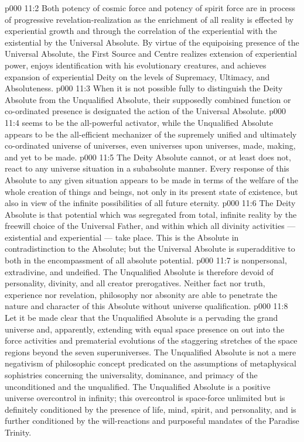 \vs p000 11:2 Both potency of cosmic force and potency of spirit force are in process of progressive revelation\hyp{}realization as the enrichment of all reality is effected by experiential growth and through the correlation of the experiential with the existential by the Universal Absolute. By virtue of the equipoising presence of the Universal Absolute, the First Source and Centre realizes extension of experiential power, enjoys identification with his evolutionary creatures, and achieves expansion of experiential Deity on the levels of Supremacy, Ultimacy, and Absoluteness.
\vs p000 11:3 \pc When it is not possible fully to distinguish the Deity Absolute from the Unqualified Absolute, their supposedly combined function or co\hyp{}ordinated presence is designated the action of the Universal Absolute.
\vs p000 11:4 \bibnobreakspace {} seems to be the all\hyp{}powerful activator, while the Unqualified Absolute appears to be the all\hyp{}efficient mechanizer of the supremely unified and ultimately co\hyp{}ordinated universe of universes, even universes upon universes, made, making, and yet to be made.
\vs p000 11:5 The Deity Absolute cannot, or at least does not, react to any universe situation in a subabsolute manner. Every response of this Absolute to any given situation appears to be made in terms of the welfare of the whole creation of things and beings, not only in its present state of existence, but also in view of the infinite possibilities of all future eternity.
\vs p000 11:6 The Deity Absolute is that potential which was segregated from total, infinite reality by the freewill choice of the Universal Father, and within which all divinity activities --- existential and experiential --- take place. This is the  Absolute in contradistinction to the  Absolute; but the Universal Absolute is superadditive to both in the encompassment of all absolute potential.
\vs p000 11:7 \bibnobreakspace {} is nonpersonal, extradivine, and undeified. The Unqualified Absolute is therefore devoid of personality, divinity, and all creator prerogatives. Neither fact nor truth, experience nor revelation, philosophy nor absonity are able to penetrate the nature and character of this Absolute without universe qualification.
\vs p000 11:8 Let it be made clear that the Unqualified Absolute is a  pervading the grand universe and, apparently, extending with equal space presence on out into the force activities and prematerial evolutions of the staggering stretches of the space regions beyond the seven superuniverses. The Unqualified Absolute is not a mere negativism of philosophic concept predicated on the assumptions of metaphysical sophistries concerning the universality, dominance, and primacy of the unconditioned and the unqualified. The Unqualified Absolute is a positive universe overcontrol in infinity; this overcontrol is space\hyp{}force unlimited but is definitely conditioned by the presence of life, mind, spirit, and personality, and is further conditioned by the will\hyp{}reactions and purposeful mandates of the Paradise Trinity.
